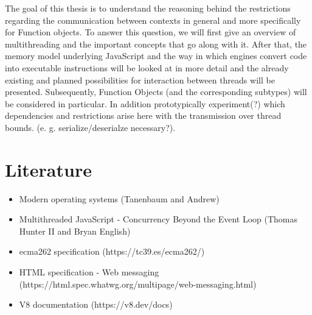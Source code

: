 The goal of this thesis is to understand the reasoning behind the restrictions regarding the communication between contexts in general and more specifically for Function objects. 
To answer this question, we will first give an overview of multithreading and the important concepts that go along with it. After that, the memory model underlying JavaScript and the way in which engines convert code into executable instructions will be looked at in more detail and the already existing and planned possibilities for interaction between threads will be presented. Subsequently, Function Objects (and the corresponding subtypes) will be considered in particular. In addition prototypically experiment(?) which dependencies and restrictions arise here with the transmission over thread bounds. (e. g. serialize/deserialze necessary?).
\\


\section{Literature}
\begin{itemize}
    \item Modern operating systems (Tanenbaum and Andrew)
    \item Multithreaded JavaScript - Concurrency Beyond the Event Loop (Thomas Hunter II and Bryan English)
    \item ecma262 specification (https://tc39.es/ecma262/)
    \item HTML specification - Web messaging (https://html.spec.whatwg.org/multipage/web-messaging.html)
    \item V8 documentation (https://v8.dev/docs)
\end{itemize}
